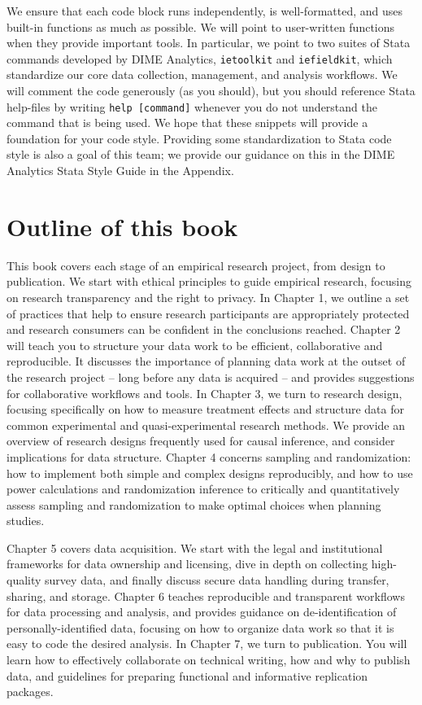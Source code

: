 We ensure that each code block runs independently, is well-formatted,
and uses built-in functions as much as possible.
We will point to user-written functions when they provide important tools.
In particular, we point to two suites of Stata commands developed by DIME Analytics,
\texttt{ietoolkit} and
\texttt{iefieldkit},
which standardize our core data collection, management, and analysis workflows.
We will comment the code generously (as you should),
but you should reference Stata help-files by writing \texttt{help [command]}
whenever you do not understand the command that is being used.
We hope that these snippets will provide a foundation for your code style.
Providing some standardization to Stata code style is also a goal of this team;
we provide our guidance on this in the DIME Analytics Stata Style Guide in the Appendix.

\section{Outline of this book}

This book covers each stage of an empirical research project, from design to publication.
We start with ethical principles to guide empirical research,
focusing on research transparency and the right to privacy.
In Chapter 1, we outline a set of practices that help to ensure
research participants are appropriately protected and
research consumers can be confident in the conclusions reached.
Chapter 2 will teach you to structure your data work to be efficient,
collaborative and reproducible.
It discusses the importance of planning data work at the outset of the research project --
long before any data is acquired -- and provides suggestions for collaborative workflows and tools.
In Chapter 3, we turn to research design,
focusing specifically on how to measure treatment effects
and structure data for common experimental and quasi-experimental research methods.
We provide an overview of research designs frequently used for
causal inference, and consider implications for data structure.
Chapter 4 concerns sampling and randomization:
how to implement both simple and complex designs reproducibly,
and how to use power calculations and randomization inference
to critically and quantitatively assess
sampling and randomization to make optimal choices when planning studies.

Chapter 5 covers data acquisition. We start with
the legal and institutional frameworks for data ownership and licensing,
dive in depth on collecting high-quality survey data,
and finally discuss secure data handling during transfer, sharing, and storage.
Chapter 6 teaches reproducible and transparent workflows for data processing and analysis,
and provides guidance on de-identification of personally-identified data,
focusing on how to organize data work so that it is easy to code the desired analysis.
In Chapter 7, we turn to publication. You will learn
how to effectively collaborate on technical writing,
how and why to publish data,
and guidelines for preparing functional and informative replication packages.


